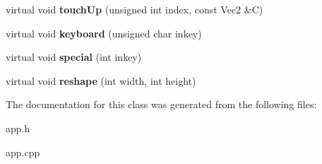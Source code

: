 \begin{DoxyCompactItemize}
\item 
\hypertarget{classg2c_1_1_app_a596c05fe3c5926e500627f17c73746d0}{
virtual void {\bfseries touchUp} (unsigned int index, const Vec2 \&C)}
\label{classg2c_1_1_app_a596c05fe3c5926e500627f17c73746d0}

\item 
\hypertarget{classg2c_1_1_app_a340468d5d76774c57c0082b1ed7e5cba}{
virtual void {\bfseries keyboard} (unsigned char inkey)}
\label{classg2c_1_1_app_a340468d5d76774c57c0082b1ed7e5cba}

\item 
\hypertarget{classg2c_1_1_app_a7245a4bf6270cadd8238fa03436a43fb}{
virtual void {\bfseries special} (int inkey)}
\label{classg2c_1_1_app_a7245a4bf6270cadd8238fa03436a43fb}

\item 
\hypertarget{classg2c_1_1_app_aa7406471675bf5a0a1204f860b0147ea}{
virtual void {\bfseries reshape} (int width, int height)}
\label{classg2c_1_1_app_aa7406471675bf5a0a1204f860b0147ea}

\end{DoxyCompactItemize}


The documentation for this class was generated from the following files:\begin{DoxyCompactItemize}
\item 
app.h\item 
app.cpp\end{DoxyCompactItemize}
